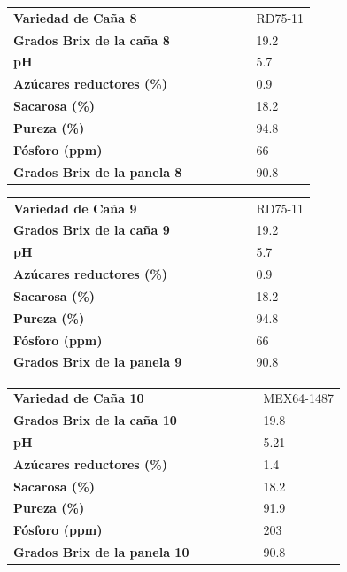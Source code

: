 \documentclass{article}%
\begin{document}
\linebreak%
\newline%
%
\linebreak%
\begin{tabular}{lcccccl}%
\textbf{Variedad de Caña 8}& & & & & &RD75{-}11\\%
\textbf{Grados Brix de la caña 8}& & & & & &19.2\\%
\textbf{pH}& & & & & &5.7\\%
\textbf{Azúcares reductores (\%)}& & & & & &0.9\\%
\textbf{Sacarosa (\%)}& & & & & &18.2\\%
\textbf{Pureza (\%)}& & & & & &94.8\\%
\textbf{Fósforo (ppm)}& & & & & &66\\%
\textbf{Grados Brix de la panela 8}& & & & & &90.8\\%
\end{tabular}%
\linebreak%
\newline%
%
\linebreak%
\begin{tabular}{lcccccl}%
\textbf{Variedad de Caña 9}& & & & & &RD75{-}11\\%
\textbf{Grados Brix de la caña 9}& & & & & &19.2\\%
\textbf{pH}& & & & & &5.7\\%
\textbf{Azúcares reductores (\%)}& & & & & &0.9\\%
\textbf{Sacarosa (\%)}& & & & & &18.2\\%
\textbf{Pureza (\%)}& & & & & &94.8\\%
\textbf{Fósforo (ppm)}& & & & & &66\\%
\textbf{Grados Brix de la panela 9}& & & & & &90.8\\%
\end{tabular}%
\linebreak%
\newline%
%
\linebreak%
\begin{tabular}{lcccccl}%
\textbf{Variedad de Caña 10}& & & & & &MEX64{-}1487\\%
\textbf{Grados Brix de la caña 10}& & & & & &19.8\\%
\textbf{pH}& & & & & &5.21\\%
\textbf{Azúcares reductores (\%)}& & & & & &1.4\\%
\textbf{Sacarosa (\%)}& & & & & &18.2\\%
\textbf{Pureza (\%)}& & & & & &91.9\\%
\textbf{Fósforo (ppm)}& & & & & &203\\%
\textbf{Grados Brix de la panela 10}& & & & & &90.8\\%
\end{tabular}%
\linebreak%
\newline%
%
\linebreak%
\end{document}
